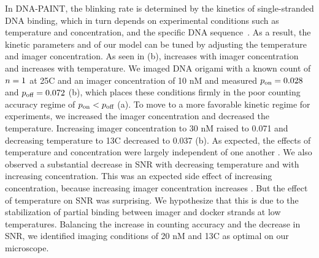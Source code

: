 In DNA-PAINT, the blinking rate is determined by the kinetics of single-stranded DNA binding,
which in turn depends on experimental conditions such as temperature and concentration, 
and the specific DNA sequence~\citep{jungmann_single-molecule_2010}.
	As a result, the kinetic parameters \pon and \poff of our model can be 
	tuned by adjusting the temperature and imager concentration. 
	As seen in (b), \pon increases with imager concentration
	and \poff increases with temperature.
	We imaged DNA origami with a known count of $n=1$ at 25\textdegree C and an 
	imager concentration of 10 nM and measured $p_\text{on}=0.028$ and $p_\text{off}=0.072$ 
	(b),
	which places these conditions firmly in the poor counting 
	accuracy regime of $p_\text{on} < p_\text{off}$ (a). %
	To move to a more favorable kinetic regime for experiments, 
	we increased the imager concentration and decreased the temperature.
	Increasing imager concentration to 30 nM raised \pon to 0.071 and 
	decreasing temperature to 13\textdegree C decreased \poff to 0.037 
	(b).
	As expected, the effects of temperature and concentration were largely independent 
	of one another \cite{jungmann_single-molecule_2010}.
	We also observed a substantial decrease in SNR with decreasing temperature 
	and with increasing concentration. 
	This was an expected side effect of increasing concentration, because increasing 
	imager concentration increases \rb.
	But the effect of temperature on SNR was surprising. 
	We hypothesize that this is due to the stabilization of partial 
	binding between imager and docker strands at low temperatures.
	Balancing the increase in counting accuracy and the decrease 
	in SNR, we identified imaging conditions of 20 nM and 13\textdegree C as 
	optimal on our microscope.

